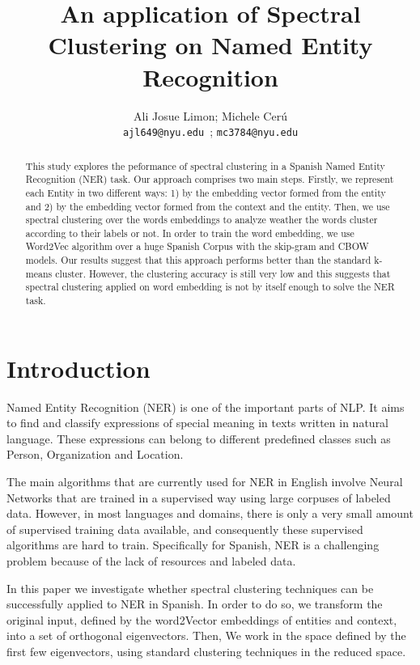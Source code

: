 \documentclass[]{article}
\title{An application of Spectral Clustering on Named Entity Recognition}
\author{Ali Josue Limon; Michele Cer\'u \\ 
	\texttt{ajl649@nyu.edu }; \texttt{mc3784@nyu.edu}
}
\begin{document}
	\maketitle
	\newcommand{\slugmaster}{%
		\slugger{siads}{xxxx}{xx}{x}{x---x}}%
	
	
	
	\begin{abstract}
		This study explores the peformance of spectral clustering in a Spanish Named Entity Recognition (NER) task. Our approach comprises two main steps. Firstly, we represent each Entity in two different ways: 1) by the embedding vector formed from the entity and 2) by the embedding vector formed from the context and the entity.  Then, we use spectral clustering over the words embeddings  to analyze weather the words cluster according to their labels or not.  In order to train the word embedding, we use Word2Vec algorithm over a huge Spanish Corpus with the skip-gram and CBOW models. Our results suggest that this approach performs better than the standard k-means cluster. However, the clustering accuracy is still very low and this suggests that spectral clustering applied on word embedding is not by itself enough to solve the NER task. 
		
	\end{abstract}
	
	\section{Introduction}
	
	Named Entity Recognition (NER) is one of the important parts of NLP. It aims to find and classify expressions of special meaning in texts written in natural language.  These expressions can belong to different predefined classes such as Person, Organization and Location. 
	
	The main algorithms that are currently used for NER in English involve Neural Networks that are trained in a supervised way using large corpuses of labeled data. However, in most languages and domains, there is only a very small amount of supervised training data available, and consequently these supervised algorithms are hard to train. Specifically for Spanish, NER is a challenging problem because of the lack of resources and labeled data. 
	
	In this paper we investigate whether spectral clustering techniques can be successfully applied to NER in Spanish. In order to do so, we transform the original input, defined by the word2Vector embeddings of entities and context, into a set of orthogonal eigenvectors. Then, We work in the space defined by the first few eigenvectors, using standard clustering techniques in the reduced space.
	
\end{document}

